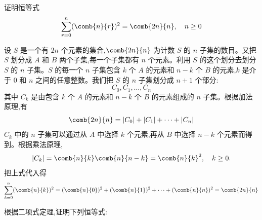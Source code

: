 \begin{questions}
    \question 证明恒等式
    \[
    \sum_{r=0}^{n} (\comb{n}{r})^2 = \comb{2n}{n}, \quad n \ge 0
    \]
    \begin{solution}
        设 $S$ 是一个有 $2n$ 个元素的集合,$\comb{2n}{n}$ 为计数 $S$ 的 $n$ 子集的数目。又把 $S$ 划分成 $A$ 和 $B$ 两个子集,每一个子集都有 $n$ 个元素。利用 $S$ 的这个划分去划分 $S$ 的 $n$ 子集。$S$ 的每一个 $n$ 子集包含 $k$ 个 $A$ 的元素和 $n-k$ 个 $B$ 的元素,$k$ 是介于 $0$ 和 $n$ 之间的任意整数。我们把 $S$ 的 $n$ 子集划分成 $n+1$ 个部分:
        \[
        C_0, C_1, \dots, C_n
        \]
        其中 $C_k$ 是由包含 $k$ 个 $A$ 的元素和 $n-k$ 个 $B$ 的元素组成的 $n$ 子集。根据加法原理,有
        \[
        \comb{2n}{n} = |C_0| + |C_1| + \dots + |C_n|
        \]
        $C_k$ 中的 $n$ 子集可以通过从 $A$ 中选择 $k$ 个元素,再从 $B$ 中选择 $n-k$ 个元素而得到。根据乘法原理,
        \[
        |C_k| = \comb{n}{k} \comb{n}{n-k} = \comb{n}{k}^2, \quad k \ge 0.
        \]
        把上式代入得
        \[
        \sum_{k=0}^{n} (\comb{n}{k})^2 = (\comb{n}{0})^2 + (\comb{n}{1})^2 + \dots + (\comb{n}{n})^2 = \comb{2n}{n}
        \]
    \end{solution}

    \question 根据二项式定理,证明下列恒等式:
\end{questions}
